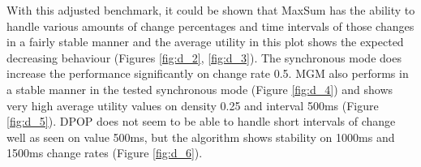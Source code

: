 
With this adjusted benchmark, it could be shown that MaxSum has the ability to handle various amounts of change percentages and time intervals of those changes in a fairly stable manner and the average utility in this plot shows the expected decreasing behaviour (Figures \ref{fig:d_2}, \ref{fig:d_3}). The synchronous mode does increase the performance significantly on change rate 0.5. MGM also performs in a stable manner in the tested synchronous mode (Figure \ref{fig:d_4}) and shows very high average utility values on density 0.25 and interval 500ms (Figure \ref{fig:d_5}). DPOP does not seem to be able to handle short intervals of change well as seen on value 500ms, but the algorithm shows stability on 1000ms and 1500ms change rates (Figure \ref{fig:d_6}).

